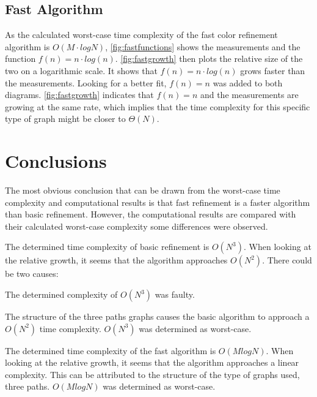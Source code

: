 \documentclass[twoside]{article}
\begin{document}
\begin{multicols}{2}
\subsection{Fast Algorithm}
As the calculated worst-case time complexity of the fast color refinement algorithm is $O(M\cdot{}logN)$, \autoref{fig:fastfunctions} shows the measurements and the function $f(n)=n\cdot{}log(n)$. \autoref{fig:fastgrowth} then plots the relative size of the two on a logarithmic scale. It shows that $f(n)=n\cdot{}log(n)$ grows faster than the measurements. Looking for a better fit, $f(n)=n$ was added to both diagrams. \autoref{fig:fastgrowth} indicates that $f(n)=n$ and the measurements are growing at the same rate, which implies that the time complexity for this specific type of graph might be closer to $\Theta(N)$.

\section{Conclusions}
\label{concl}
The most obvious conclusion that can be drawn from the worst-case time complexity and computational results is that fast refinement is a faster algorithm than basic refinement. However, the computational results are compared with their calculated worst-case complexity some differences were observed.

The determined time complexity of basic refinement is $O(N^3)$. When looking at the relative growth, it seems that the algorithm approaches $O(N^2)$. There could be two causes:
\begin{compactitem}
	\item The determined complexity of $O(N^3)$ was faulty.
	\item The structure of the three paths graphs causes the basic algorithm to approach a $O(N^2)$ time complexity. $O(N^3)$ was determined as worst-case.
\end{compactitem}

The determined time complexity of the fast algorithm is $O(MlogN)$. When looking at the relative growth, it seems that the algorithm approaches a linear complexity. This can be attributed to the structure of the type of graphs used, three paths. $O(MlogN)$ was determined as worst-case.

\label{references}
\printbibliography


\end{multicols}
\end{document}
